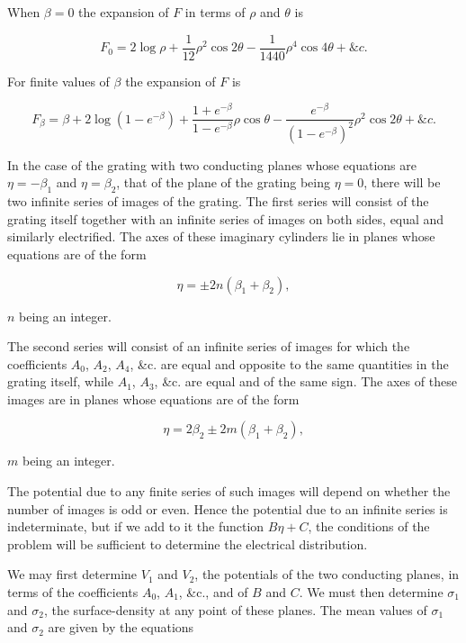 \documentclass[11pt,a4paper]{article}
\begin{document}
When $\beta=0$ the expansion of $F$ in terms of $\rho$ and $\theta$ is

\begin{equation}\tag{18}
F_0=2\log\rho+\frac{1}{12}\rho^2\cos 2\theta
-\frac{1}{1440}\rho^4\cos 4\theta+\&c.
\end{equation}

For finite values of $\beta$ the expansion of $F$ is

\begin{equation}\tag{19}
F_\beta=\beta+2\log(1-e^{-\beta})
+\frac{1+e^{-\beta}}{1-e^{-\beta}}\rho\cos\theta
-\frac{e^{-\beta}}{(1-e^{-\beta})^2}\rho^2\cos2\theta+\&c.
\end{equation}

In the case of the grating with two conducting planes whose equations are
$\eta=-\beta_1$ and $\eta=\beta_2$, that of the plane of the grating
being $\eta=0$, there will be two infinite series of images of the
grating. The first series will consist of the grating itself together
with an infinite series of images on both sides, equal and similarly
electrified. The axes of these imaginary cylinders lie in planes whose
equations are of the form

\begin{equation}\tag{20}
\eta=\pm 2n(\beta_1+\beta_2),
\end{equation}

$n$ being an integer.

The second series will consist of an infinite series of images for which
the coefficients $A_0$, $A_2$, $A_4$, \&c. are equal and opposite to the
same quantities in the grating itself, while $A_1$, $A_3$, \&c. are
equal and of the same sign. The axes of these images are in planes whose
equations are of the form

\begin{equation}\tag{21}
\eta=2\beta_2\pm 2m(\beta_1+\beta_2),
\end{equation}

$m$ being an integer.

The potential due to any finite series of such images will depend on
whether the number of images is odd or even. Hence the potential due to
an infinite series is indeterminate, but if we add to it the function
$B\eta+C$, the conditions of the problem will be sufficient to determine
the electrical distribution.

We may first determine $V_1$ and $V_2$, the potentials of the two
conducting planes, in terms of the coefficients $A_0$, $A_1$, \&c., and
of $B$ and $C$. We must then determine $\sigma_1$ and $\sigma_2$, the
surface-density at any point of these planes. The mean values of
$\sigma_1$ and $\sigma_2$ are given by the equations
\end{document}
